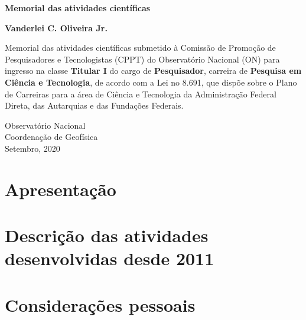 \documentclass{serrapilheira}
\begin{document}
	
\begin{titlepage}
	\begin{center}
		\vspace*{3cm}
		
		\LARGE
		\textbf{Memorial das atividades científicas}
		
		\vspace{2.5cm}
		\large
		\textbf{Vanderlei C. Oliveira Jr.}
		
		\hspace{.45\textwidth}
		\begin{minipage}{.5\textwidth}
			\vspace{3.0cm}
			\normalsize
			Memorial das atividades científicas submetido à Comissão de Promoção de
			Pesquisadores e Tecnologistas (CPPT) do Observatório Nacional (ON) para
			ingresso na classe \textbf{Titular I} do cargo de \textbf{Pesquisador},  
			carreira de \textbf{Pesquisa em Ciência e Tecnologia}, de acordo com 
			a Lei no 8.691, que dispõe sobre o Plano de Carreiras para a área de 
			Ciência e Tecnologia da Administração Federal Direta, das Autarquias e 
			das Fundações Federais.
		\end{minipage}%
		\vspace*{\fill}
		
		
		\vspace{0.8cm}
		
		\small
		Observatório Nacional\\
		Coordenação de Geofísica \\
		Setembro, 2020
		
	\end{center}
\end{titlepage}

\tableofcontents

\newpage
\chapter{Apresentação}
\renewcommand\refname{}


\chapter{Descrição das atividades desenvolvidas desde 2011}
\renewcommand\refname{}


\newpage
\chapter{Considerações pessoais}
\renewcommand\refname{}



\newpage

%
\end{document}
